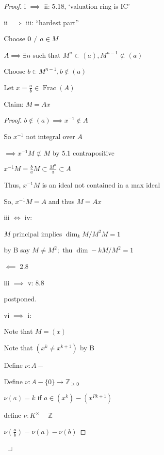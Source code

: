 \documentclass{article}
\theoremstyle{definition}
\newcommand{\Frac}{\operatorname{Frac}}
\begin{document}
\begin{proof}
    i \(\implies\) ii: 5.18, `valuation ring is IC'

    ii \(\implies\) iii: ``hardest part'' 

    Choose \(0 \neq a \in M\)

    \(A \implies \exists n\) such that \(M^n \subset (a), M^{n-1} \not\subset (a)\)  

    Choose \(b\in M^{n-1}, b \notin (a)\) 

    Let \(x = \frac{a}{b}\in \Frac(A)\)
    
    Claim: \(M = Ax\) 

    \begin{proof}
        \(b\notin (a)\implies x ^{-1} \notin A\)
        
        So \(x ^{-1}\)  not integral over \(A\) 

        \(\implies x ^{-1} M \not\subset M\) by 5.1 contrapositive

        \(x ^{-1} M = \frac{b}{a} M \subset \frac{M^n}{a} \subset A\)
        
        Thus, \(x ^{-1} M\) is an ideal not contained in a max ideal
        
        So, \(x ^{-1} M = A\) and thus \(M = Ax\)
        
        iii \(\iff\) iv:
        
        \(M\) principal implies \(\dim_k M / M^2 M=1\)
        
        by B say \(M \neq M^2;\) thu \(\dim-k M / M^2 = 1\) 
        
        \(\impliedby\) 2.8
        
        iii \(\implies\) v: 8.8                                          
        
        postponed.

        vi \(\implies\) i:
        
        Note that \(M = (x)\) 

        Note that \((x^k \neq x^{k+1})\) by B
        
        Define \(\nu : A -\) 


        Define \(\nu: A - \{ 0 \} \to \mathbb{Z}_{\geq 0}\) 
        
        \(\nu(a)=k\) if \(a \in (x^k)-(x^{Pk+1} )\)  

        define \(\nu : K^\times -\mathbb{Z}\)
        
        \(\nu(\frac{a}{b})=\nu (a)-\nu (b)\) 

    \end{proof}
\end{proof}
\end{document}
